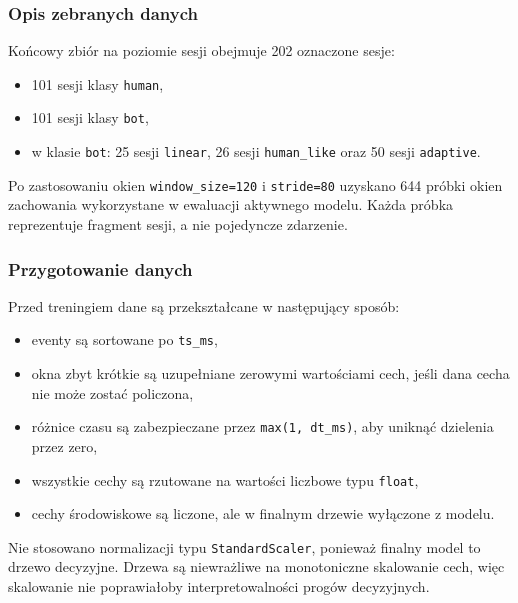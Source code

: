 \subsubsection{Opis zebranych danych}
Końcowy zbiór na poziomie sesji obejmuje 202 oznaczone sesje:
\begin{itemize}
  \item 101 sesji klasy \texttt{human},
  \item 101 sesji klasy \texttt{bot},
  \item w klasie \texttt{bot}: 25 sesji \texttt{linear}, 26 sesji
  \texttt{human\_like} oraz 50 sesji \texttt{adaptive}.
\end{itemize}

Po zastosowaniu okien \texttt{window\_size=120} i \texttt{stride=80}
uzyskano 644 próbki okien zachowania wykorzystane w ewaluacji aktywnego modelu.
Każda próbka reprezentuje fragment sesji, a nie pojedyncze zdarzenie.

\subsubsection{Przygotowanie danych}
Przed treningiem dane są przekształcane w następujący sposób:
\begin{itemize}
  \item eventy są sortowane po \texttt{ts\_ms},
  \item okna zbyt krótkie są uzupełniane zerowymi wartościami cech, jeśli dana
  cecha nie może zostać policzona,
  \item różnice czasu są zabezpieczane przez \texttt{max(1, dt\_ms)}, aby uniknąć
  dzielenia przez zero,
  \item wszystkie cechy są rzutowane na wartości liczbowe typu \texttt{float},
  \item cechy środowiskowe są liczone, ale w finalnym drzewie wyłączone z modelu.
\end{itemize}

Nie stosowano normalizacji typu \texttt{StandardScaler}, ponieważ finalny model
to drzewo decyzyjne. Drzewa są niewrażliwe na monotoniczne skalowanie cech, więc
skalowanie nie poprawiałoby interpretowalności progów decyzyjnych.

